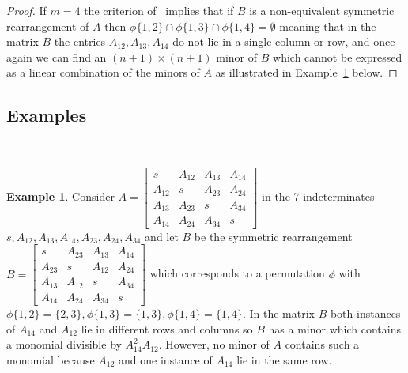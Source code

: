 \documentclass{article}
\theoremstyle{definition}
\newtheorem{Example}{Example}
\renewcommand{\|}{|}
\newcommand{\arun}[1]{{\color{cyan} #1}}
\begin{document}
\begin{proof}
 
If $m =4$ the criterion of~\cite[Lemma 1.2]{boutin2007which} implies that if $B$ is a non-equivalent symmetric rearrangement
of $A$ then $\phi\{1,2\} \cap \phi\{1,3\} \cap \phi\{1,4\} = \emptyset$ meaning that
in the matrix $B$ the entries $A_{12}, A_{13}, A_{14}$ do not lie in a single column or row, and once again
we can find an $(n+1) \times (n+1)$ minor of $B$ which cannot be expressed as a linear combination of the minors of $A$ as illustrated
in Example~\ref{ex.34} below.
\end{proof}
\subsection{Examples} \,\\

\begin{Example}\label{ex.34}
Consider $A = \begin{bmatrix} s & A_{12} & A_{13} & A_{14}\\
A_{12} & s & A_{23} & A_{24}\\
A_{13} & A_{23} & s & A_{34}\\
A_{14} & A_{24} & A_{34} & s\end{bmatrix}$ in the 7 indeterminates~$s, A_{12}, A_{13}, A_{14}, A_{23}, A_{24}, A_{34}$
and let $B$ be the symmetric rearrangement 
$B = \begin{bmatrix} s & A_{23} & A_{13}&  A_{14}\\
A_{23} & s & A_{12} & A_{24}\\
A_{13} & A_{12} & s & A_{34}\\
A_{14} & A_{24} & A_{34} & s\end{bmatrix}$
which corresponds to a permutation $\phi$ with $\phi\{1,2\} = \{2,3\}, \phi\{1,3\} = \{1,3\}, \phi\{1,4\} = \{1,4\}$.
In the matrix $B$ both instances of $A_{14}$ and $A_{12}$ lie in different rows and columns so $B$ has a minor which contains a monomial divisible by $A_{14}^2 A_{12}$. However, no minor of $A$ contains
such a monomial because $A_{12}$ and one instance of $A_{14}$ lie in the same row.
\end{Example}
\end{document}
